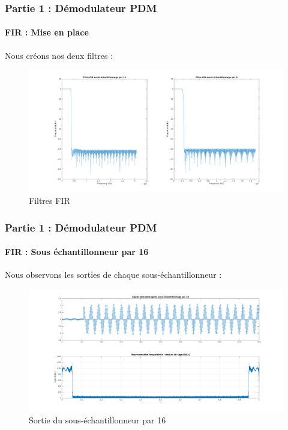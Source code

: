 \documentclass[
10pt,
aspectratio=169,
]{beamer}
\begin{document}
\begin{frame}
\frametitle{Partie 1 : Démodulateur PDM} 
\framesubtitle{FIR : Mise en place} 
Nous créons nos deux filtres : 
\begin{figure}[h]
    \centering
    \includegraphics[scale=0.2]{Images/FIR.png}
    \caption{Filtres FIR}
    \label{fig:FIR}
\end{figure}
\end{frame}

\begin{frame}
\frametitle{Partie 1 : Démodulateur PDM} 
\framesubtitle{FIR : Sous échantillonneur par 16}  
Nous observons les sorties de chaque sous-échantillonneur : 
\begin{figure}[h]
    \centering
    \includegraphics[scale=0.2]{Images/signal16.png}
    \caption{Sortie du sous-échantillonneur par 16}
    \label{fig:sig16}
\end{figure}
\end{frame}
\end{document}
